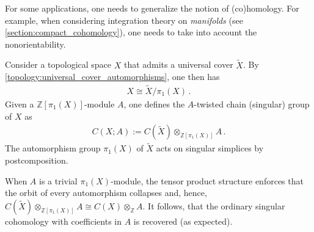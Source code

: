     For some applications, one needs to generalize the notion of (co)homology. For example, when considering integration theory on \textit{manifolds} (see \cref{section:compact_cohomology}), one needs to take into account the nonorientability.

    Consider a topological space $X$ that admits a universal cover $\widetilde{X}$. By \cref{topology:universal_cover_automorphisms}, one then has
    \begin{gather}
        X\cong\widetilde{X}/\pi_1(X)\,.
    \end{gather}
    Given a $\mathbb{Z}[\pi_1(X)]$-module $A$, one defines the $A$-twisted chain (singular) group of $X$ as
    \begin{gather}
        C(X;A):=C(\widetilde{X})\otimes_{\mathbb{Z}[\pi_1(X)]}A\,.
    \end{gather}
    The automorphism group $\pi_1(X)$ of $\widetilde{X}$ acts on singular simplices by postcomposition.

    When $A$ is a trivial $\pi_1(X)$-module, the tensor product structure enforces that the orbit of every automorphism collapses and, hence, $C(\widetilde{X})\otimes_{\mathbb{Z}[\pi_1(X)]}A\cong C(X)\otimes_{\mathbb{Z}}A$. It follows, that the ordinary singular cohomology with coefficients in $A$ is recovered (as expected).

\section{}\label{section:eilenberg_steenrod}

